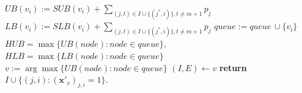 \documentclass[moor,sglanonrev]{informs4}
\theoremstyle{plain}
\begin{document}
\begin{APPENDICES}
\begin{algorithm}
\begin{algorithmic}[1]
            \State $UB(v_i) := SUB(v_i) + \sum\limits_{(j,t) \in I \cup \{(j^*, i)\}, t \ne m+1} p_j$
            \State $LB(v_i) := SLB(v_i) + \sum\limits_{(j,t) \in I \cup \{(j^*, i)\}, t \ne m+1} p_j$
                \State $queue := queue \,\cup \{v_i\}$
            \EndIf
        \EndFor
        \State $HUB = \max\{UB(node): node \in queue\}$, $HLB = \max\{LB(node): node \in queue\}$
    \EndWhile
    \State $v := \arg\max \{UB(node): node \in queue\}$
    \State $(I,E) \leftarrow v$
    \State \textbf{return} $I \cup \{(j,i): (\bm{x}'_v)_{j,i}=1\}$.
\end{algorithmic}
\end{algorithm}



\end{APPENDICES}
\end{document}
